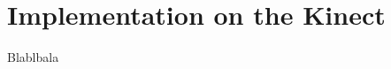 \chapter{Implementation on the Kinect}
\label{chap:implementation_kinect}

\noindent Blablbala
\newline
